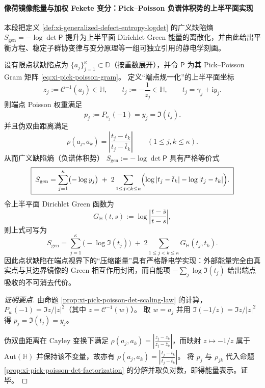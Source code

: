 \paragraph{像荷镜像能量与加权 Fekete 变分：Pick--Poisson 负谱体积势的上半平面实现}
本段把定义 \ref{def:xi-generalized-defect-entropy-logdet} 的广义缺陷熵
\(
S_{\mathrm{gen}}=-\log\det\mathsf P
\)
提升为上半平面 Dirichlet Green 能量的离散化，并由此给出平衡方程、稳定子群协变律与变分原理等一组可独立引用的静电学刻画。

\begin{proposition}\label{prop:xi-pick-poisson-image-charge-green-energy}
设有限点状缺陷点为 \(\{a_j\}_{j=1}^{\kappa}\subset\mathbb{D}\)（按重数展开），并令 \(\mathsf P\) 为其 Pick--Poisson Gram 矩阵 \eqref{eq:xi-pick-poisson-gram}。
定义“端点规一化”的上半平面坐标
\[
z_j:=\mathcal{C}^{-1}(a_j)\in\mathbb{H},
\qquad
t_j:=-\frac{1}{z_j}\in\mathbb{H},
\qquad
t_j=\gamma_j+\mathrm{i}y_j.
\]
则端点 Poisson 权重满足
\[
\boxed{\;p_j:=P_{a_j}(-1)=y_j=\Im(t_j).\;}
\]
并且伪双曲距离满足
\[
\boxed{\;
\rho(a_j,a_k)=\left|\frac{t_j-t_k}{t_j-\overline t_k}\right|\qquad(1\le j,k\le\kappa).\;}
\]
从而广义缺陷熵（负谱体积势）
\(
S_{\mathrm{gen}}:=-\log\det\mathsf P
\)
具有严格等价式
\[
\boxed{\;
S_{\mathrm{gen}}
=\sum_{j=1}^{\kappa}\bigl(-\log y_j\bigr)
\;+\;
2\sum_{1\le j<k\le\kappa}\Bigl(\log|t_j-\overline t_k|-\log|t_j-t_k|\Bigr).\;}
\]
令上半平面 Dirichlet Green 函数为
\[
G_{\mathbb{H}}(t,s):=\log\left|\frac{t-\overline s}{t-s}\right|,
\]
则上式可写为
\[
S_{\mathrm{gen}}
=\sum_{j=1}^{\kappa}\bigl(-\log\Im(t_j)\bigr)
\;+\;
2\sum_{1\le j<k\le\kappa}G_{\mathbb{H}}(t_j,t_k).
\]
因此点状缺陷在端点视界下的“压缩能量”具有严格静电学实现：外部能量完全由真实点与其边界镜像的 Green 相互作用封闭，而自能项 \(-\sum_j\log\Im(t_j)\) 给出端点吸收的不可消去代价。
\end{proposition}
\begin{proof}[证明要点]
由命题 \ref{prop:xi-pick-poisson-det-scaling-law} 的计算，
\(
P_w(-1)=\Im z/|z|^2
\)（其中 \(z=\mathcal{C}^{-1}(w)\)）。
取 \(w=a_j\) 并用 \(\Im(-1/z)=\Im z/|z|^2\) 得 \(p_j=\Im(t_j)=y_j\)。
\par
伪双曲距离在 Cayley 变换下满足 \(\rho(a_j,a_k)=\left|\frac{z_j-z_k}{z_j-\overline z_k}\right|\)，而映射 \(z\mapsto -1/z\) 属于 \(\mathrm{Aut}(\mathbb{H})\) 并保持该不变量，故亦有 \(\rho(a_j,a_k)=\left|\frac{t_j-t_k}{t_j-\overline t_k}\right|\)。
将 \(p_j\) 与 \(\rho_{jk}\) 代入命题 \ref{prop:xi-pick-poisson-det-factorization} 的分解并取负对数，即得能量表示。证毕。
\end{proof}

